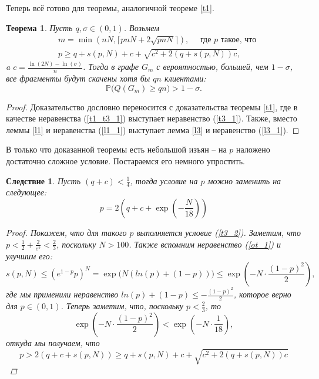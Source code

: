 \documentclass{matmex-diploma-custom}
\newcommand{\PRob}{\mathbb P}
\newcommand{\leqs}{\leqslant}
\newcommand{\geqs}{\geqslant}
\newtheorem{theorem}{Теорема}
\newtheorem{cons}{Следствие}
\theoremstyle{named}
\begin{document}
Теперь всё готово для теоремы, аналогичной теореме \ref{t1}.

\begin{theorem}\label{t3}
Пусть $q, \sigma \in (0, 1)$. Возьмем 
\begin{align}
& m = \min(nN, \lceil pnN + 2\sqrt{pnN} \rceil), \quad \text{ где $p$ такое, что} 
	\\
& p \geqs q + s(p, N) + c + \sqrt{c^2+2(q+s(p, N))c}, 
\end{align}
a $c = \frac{\ln(2N) - \ln(\sigma)}{n}$.
Тогда в графе $G_m$ с вероятностью, большей, чем $1 - \sigma$, все фрагменты будут скачены хотя бы $qn$ клиентами:
\begin{equation}
\PRob\big(Q(G_m) \geqs qn\big) > 1 - \sigma.
\end{equation}
\end{theorem}

\begin{proof}
Доказательство дословно переносится с доказательства теоремы \ref{t1}, 
где в качестве неравенства (\ref{t1_t3_1}) выступает неравенство (\ref{t3_1}). 
Также, вместо леммы \ref{l1} и неравенства (\ref{l1_1}) выступает лемма \ref{l3} и неравенство (\ref{l3_1}).
\end{proof}

В только что доказанной теоремы есть небольшой изъян -- на $p$ наложено достаточно сложное условие. 
Постараемся его немного упростить.
\begin{cons}
Пусть $(q+c) < \frac{1}{4}$, тогда условие на $p$ можно заменить на следующее:
\begin{equation}
p = 2\left(q + c + \exp\left(-\frac{N}{18}\right) \right)
\end{equation}

\begin{proof}
Покажем, что для такого $p$ выполняется условие (\ref{t3_2}).
Заметим, что $p < \frac{1}{2} + \frac{2}{e^5} < \frac{2}{3}$, поскольку $N > 100$.
Также вспомним неравенство (\ref{ot_1}) и улучшим его:
\begin{equation}
s(p, N) \leqs (e^{1-p} p)^N 
	=
\exp\big(N( ln(p) + (1-p) )\big)
	\leqs
\exp\left( - N \cdot \frac{(1-p)^2}{2}\right),
\end{equation}
где мы применили неравенство $ln(p) + (1-p) \leqs - \frac{(1-p)^2}{2}$, которое верно для $p\in(0,1)$.
Теперь заметим, что, поскольку $p < \frac{2}{3}$, то 
\begin{equation}
\exp\left( - N \cdot \frac{(1-p)^2}{2}\right) < \exp\left( - N\cdot \frac{1}{18}\right),
\end{equation}
откуда мы получаем, что 
\begin{equation}
p > 2(q+c+s(p,N)) \geqs q + s(p, N) + c + \sqrt{c^2+2(q+s(p, N))c}
\end{equation}
\end{proof}
\end{cons}
\end{document}
